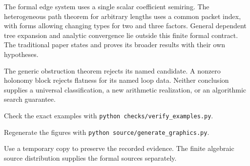 The formal edge system uses a single scalar coefficient semiring. The heterogeneous path theorem for arbitrary lengths uses a common packet index, with forms allowing changing types for two and three factors. General dependent tree expansion and analytic convergence lie outside this finite formal contract. The traditional paper states and proves its broader results with their own hypotheses.

The generic obstruction theorem rejects its named candidate. A nonzero holonomy block rejects flatness for its named loop data. Neither conclusion supplies a universal classification, a new arithmetic realization, or an algorithmic search guarantee.

Check the exact examples with \mbox{\texttt{python checks/verify\_examples.py}}.\par
Regenerate the figures with \mbox{\texttt{python source/generate\_graphics.py}}.\par
Use a temporary copy to preserve the recorded evidence. The finite algebraic source distribution supplies the formal sources separately.

